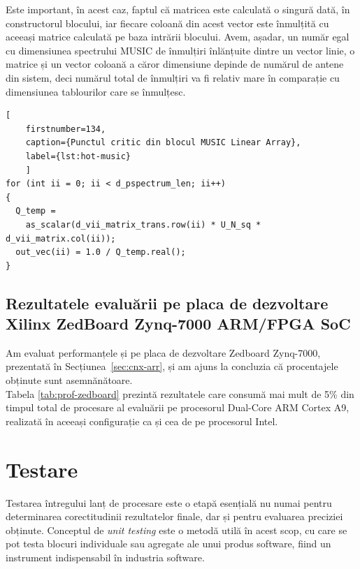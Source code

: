 Este important, în acest caz, faptul că matricea  este
calculată o singură dată, în constructorul blocului, iar fiecare coloană din
acest vector este înmulțită cu aceeași matrice calculată pe baza intrării
blocului. Avem, așadar, un număr egal cu dimensiunea spectrului MUSIC de
înmulțiri înlănțuite dintre un vector linie, o matrice și un vector coloană a
căror dimensiune depinde de numărul de antene din sistem, deci numărul total de
înmulțiri va fi relativ mare în comparație cu dimensiunea tablourilor care se
înmulțesc. \\

\begin{lstlisting}[
	firstnumber=134,
	caption={Punctul critic din blocul MUSIC Linear Array},
	label={lst:hot-music}
    ]
for (int ii = 0; ii < d_pspectrum_len; ii++)
{
  Q_temp = 
    as_scalar(d_vii_matrix_trans.row(ii) * U_N_sq * d_vii_matrix.col(ii));
  out_vec(ii) = 1.0 / Q_temp.real();
}
\end{lstlisting}

\subsection{Rezultatele evaluării pe placa de dezvoltare Xilinx
ZedBoard Zynq-7000 \mbox{ARM/FPGA} SoC}

Am evaluat performanțele și pe placa de dezvoltare Zedboard Zynq-7000, prezentată
în Secțiunea~\ref{sec:cnx-arr}, și am ajuns la concluzia că procentajele obținute
sunt asemnănătoare. \\

Tabela \ref{tab:prof-zedboard} prezintă rezultatele care consumă mai mult de 5\%
din timpul total de procesare al evaluării pe procesorul Dual-Core ARM Cortex
A9, realizată în aceeași configurație ca și cea de pe procesorul Intel.



\section{Testare}
\label{sec:testing}

Testarea întregului lanț de procesare este o etapă esențială nu numai pentru
determinarea corectitudinii rezultatelor finale, dar și pentru evaluarea
preciziei obținute. Conceptul de \textit{unit testing} este o metodă utilă în
acest scop, cu care se pot testa blocuri individuale sau agregate ale unui
produs software, fiind un instrument indispensabil în industria
software. \\

